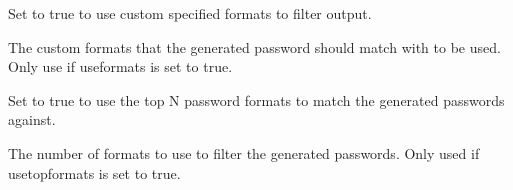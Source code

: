\documentclass[letterpaper,10pt,english]{sphinxmanual}
\begin{document}
\begin{fulllineitems}
\sphinxAtStartPar
Set to true to use custom specified formats to filter output.

\begin{sphinxVerbatim}[commandchars=\\\{\}]
  
\end{sphinxVerbatim}

\end{fulllineitems}


\begin{fulllineitems}
\label{\detokenize{usage:formats}}
\sphinxAtStartPar
The custom formats that the generated password should match with to be used. Only use if use\sphinxhyphen{}formats is set to true.

\begin{sphinxVerbatim}[commandchars=\\\{\}]
  \PYG{p}{[}\PYG{p}{]}
\end{sphinxVerbatim}

\end{fulllineitems}



\begin{fulllineitems}
\sphinxAtStartPar
Set to true to use the top N password formats to match the generated passwords against.

\begin{sphinxVerbatim}[commandchars=\\\{\}]
  
\end{sphinxVerbatim}

\end{fulllineitems}



\begin{fulllineitems}
\sphinxAtStartPar
The number of formats to use to filter the generated passwords. Only used if use\sphinxhyphen{}top\sphinxhyphen{}formats is set to true.

\begin{sphinxVerbatim}[commandchars=\\\{\}]
   
\end{sphinxVerbatim}

\end{fulllineitems}
\end{document}
